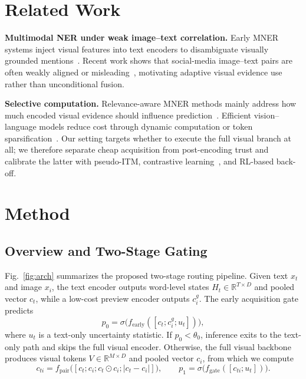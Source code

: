 \documentclass{llncs}
\begin{document}
\section{Related Work}
\label{sec:related}

\noindent\textbf{Multimodal NER under weak image--text correlation.}
Early MNER systems inject visual features into text encoders to disambiguate visually grounded mentions~\cite{lu_visual_2018,yu_improving_2020,zhang_adaptive_2018,zhao_learning_2022}. Recent work shows that social-media image--text pairs are often weakly aligned or misleading~\cite{huang_mner-mi_2024,li_llms_2024,xu_enhancing_2025,xu_effective_2024}, motivating adaptive visual evidence use rather than unconditional fusion.

\noindent\textbf{Selective computation.}
Relevance-aware MNER methods mainly address how much encoded visual evidence should influence prediction~\cite{chen_can_2021,sun_rpbert_2021,xu_effective_2024}. Efficient vision--language models reduce cost through dynamic computation or token sparsification~\cite{huang_dynamic-llava_2024,zhang_sparsevlm_2025}. Our setting targets whether to execute the full visual branch at all; we therefore separate cheap acquisition from post-encoding trust and calibrate the latter with pseudo-ITM, contrastive learning~\cite{oord_representation_2019}, and RL-based back-off.

\section{Method}

\subsection{Overview and Two-Stage Gating}\label{sec:arch}
Fig.~\ref{fig:arch} summarizes the proposed two-stage routing pipeline. Given text $x_t$ and image $x_i$, the text encoder outputs word-level states $H_t\in\mathbb{R}^{T\times D}$ and pooled vector $c_t$, while a low-cost preview encoder outputs $c_i^g$. The early acquisition gate predicts
\begin{equation}
p_0=\sigma\!\big(f_{\mathrm{early}}([c_t;c_i^g;u_t])\big),
\end{equation}
where $u_t$ is a text-only uncertainty statistic. If $p_0<\theta_0$, inference exits to the text-only path and skips the full visual encoder. Otherwise, the full visual backbone produces visual tokens $V\in\mathbb{R}^{M\times D}$ and pooled vector $c_i$, from which we compute
\begin{equation}
c_{ti}=f_{\mathrm{pair}}\!\big([c_t;c_i;c_t\odot c_i;|c_t-c_i|]\big),\qquad
p_1=\sigma\!\big(f_{\mathrm{gate}}([c_{ti};u_t])\big).
\end{equation}
\end{document}
